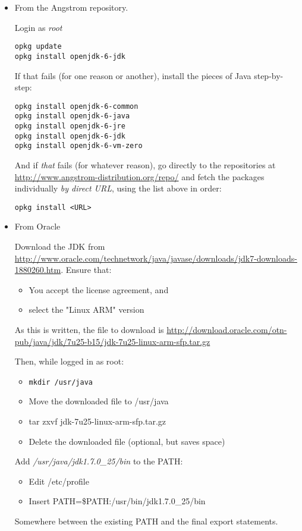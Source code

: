 \begin{itemize}
\item From the Angstrom repository.

Login as \emph{root}
\begin{verbatim}
opkg update
opkg install openjdk-6-jdk
\end{verbatim}
If that fails (for one reason or another), install the pieces of Java step-by-step:
\begin{verbatim}
opkg install openjdk-6-common
opkg install openjdk-6-java
opkg install openjdk-6-jre
opkg install openjdk-6-jdk
opkg install openjdk-6-vm-zero 
\end{verbatim}
And if \emph{that} fails (for whatever reason), go directly to the repositories at \url{http://www.angstrom-distribution.org/repo/} and fetch the packages individually \emph{by direct URL}, using the list above in order:
\begin{verbatim}
opkg install <URL>
\end{verbatim}
\item From Oracle

Download the JDK from \url{http://www.oracle.com/technetwork/java/javase/downloads/jdk7-downloads-1880260.htm}.
Ensure that:
\begin{itemize}
\item You accept the license agreement, and
\item select the "Linux ARM" version 
\end{itemize}

As this is written, the file to download is
\url{http://download.oracle.com/otn-pub/java/jdk/7u25-b15/jdk-7u25-linux-arm-sfp.tar.gz}


Then, while logged in as root:
\begin{itemize}
\item \begin{verbatim}
mkdir /usr/java
\end{verbatim}
\item Move the downloaded file to /usr/java
\item tar zxvf jdk-7u25-linux-arm-sfp.tar.gz
\item Delete the downloaded file (optional, but saves space)
\end{itemize}
Add \emph{/usr/java/jdk1.7.0\_25/bin} to the PATH:
\begin{itemize}
\item Edit /etc/profile
\item Insert PATH=\$PATH:/usr/bin/jdk1.7.0\_25/bin  
\end{itemize}
Somewhere between the existing PATH and the final export statements.
\end{itemize}


